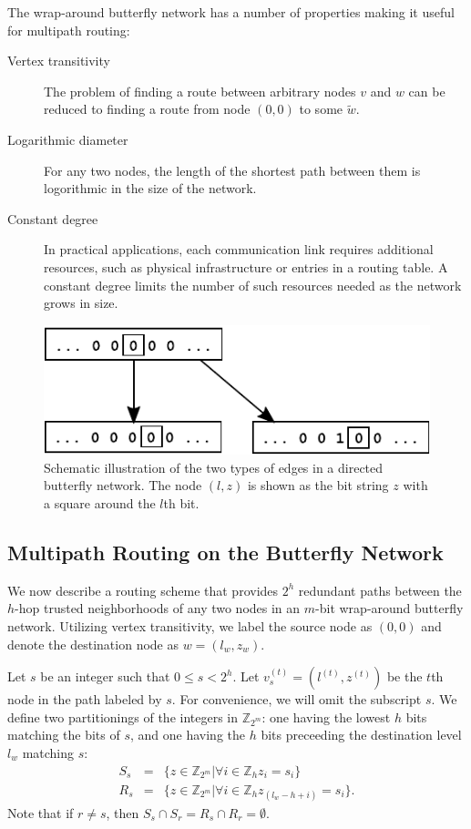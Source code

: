 \documentclass[twocolumn]{article}
\newcommand{\beq}{\begin{eqnarray}}
\newcommand{\eeq}{\end{eqnarray}}
\begin{document}
The wrap-around butterfly network has a number of properties making it useful for multipath routing:
\begin{description}
\item[Vertex transitivity]
The problem
of finding a route between arbitrary nodes $v$ and $w$
can be reduced to finding a route from node $(0,0)$ to some $\tilde{w}$.
\item[Logarithmic diameter]
For any two nodes, the length of the shortest path between them is logorithmic
in the size of the network.
\item[Constant degree]
In practical applications, each communication link requires additional resources,
such as physical infrastructure or entries in a routing table.
A constant degree limits the number of such resources needed as the network
grows in size.
\end{description}

\begin{figure}
\begin{center}
\includegraphics{fig-butterfly.pdf}
\end{center}
\caption{
Schematic illustration of the two types of edges in a directed butterfly network.
The node $(l,z)$ is shown as the bit string $z$ with a square around the $l$th bit.
\label{fig:butterfly}
}
\end{figure}

\subsection{Multipath Routing on the Butterfly Network}

We now describe a routing scheme that provides $2^h$ redundant paths between
the $h$-hop trusted neighborhoods of any two nodes in an $m$-bit
wrap-around butterfly network.
Utilizing vertex transitivity, we label the source node as $(0, 0)$ and
denote the destination node as $w = (l_w, z_w)$.

Let $s$ be an integer such that $0 \leq s < 2^h$.
Let $v_s^{(t)} = (l^{(t)}, z^{(t)})$ be the $t$th node in the path labeled by $s$.
For convenience, we will omit the subscript $s$.
We define two partitionings of the integers in $\mathbb{Z}_{2^m}$:
one having the lowest $h$ bits matching the
bits of $s$, and one having the $h$ bits preceeding the destination level $l_w$
matching $s$:
\beq
S_s &=& \{z \in \mathbb{Z}_{2^m} | \forall i \in \mathbb{Z}_h z_i = s_i \} \\
R_s &=& \{z \in \mathbb{Z}_{2^m} | \forall i \in \mathbb{Z}_h z_{(l_w - h + i)} = s_i \}.
\eeq
Note that if $r \neq s$, then $S_s \cap S_r = R_s \cap R_r = \emptyset$.
\end{document}
